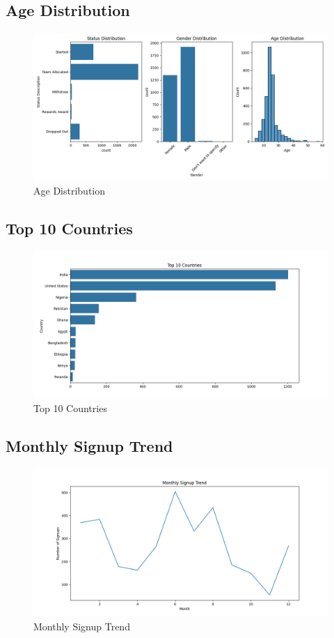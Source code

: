 \documentclass{article}
\begin{document}
\subsection{Age Distribution}
\begin{figure}[H]
    \centering
    \includegraphics[width=\textwidth]{../Statistics/Figure_1.png}
    \caption{Age Distribution}
\end{figure}

\subsection{Top 10 Countries}
\begin{figure}[H]
    \centering
    \includegraphics[width=\textwidth]{../Statistics/Figure_2.png}
    \caption{Top 10 Countries}
\end{figure}

\subsection{Monthly Signup Trend}
\begin{figure}[H]
    \centering
    \includegraphics[width=\textwidth]{../Statistics/Figure_3.png}
    \caption{Monthly Signup Trend}
\end{figure}
\end{document}
